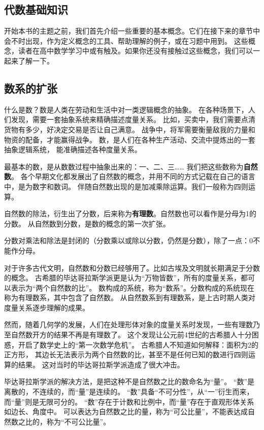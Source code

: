 \documentclass[12pt,UTF8]{ctexbook}
\begin{document}
\begin{appendix}

\chapter{代数基础知识}
开始本书的主题之前，我们首先介绍一些重要的基本概念。它们在接下来的章节中会不时出现，作为定义概念的工具、帮助理解的例子，或在习题中用到。
这些概念，读者在高中数学学习中或有触及。如果你还没有接触过这些概念，我们可以一起来了解一下。

\section{数系的扩张}
什么是数？数是人类在劳动和生活中对一类逻辑概念的抽象。
在各种场景下，人们发现，需要一套抽象系统来精确描述度量关系。
比如，买卖中，我们需要点清货物有多少，好决定交易是否让自己满意。
战争中，将军需要衡量敌我的力量和物资的配备，才能赢得战争。
数，是人们在各种生产活动、交流中提炼出的一套抽象逻辑系统，
能准确描述各种度量关系。

最基本的数，是从数数过程中抽象出来的：一、二、三…… 我们把这些数称为\textbf{自然数}。
各个早期文化都发展出了自然数的概念，并用不同的方式记载在自己的语言中，是为数字和数词。
伴随自然数出现的是加减乘除运算。我们一般称为四则运算。

自然数的除法，衍生出了分数，后来称为\textbf{有理数}。自然数也可以看作是分母为1的分数。
从自然数到分数，是数的概念的第一次扩张。

分数对乘法和除法是封闭的（分数乘以或除以分数，仍然是分数），除了一点：0不能作分母。

对于许多古代文明，自然数和分数已经够用了。比如古埃及文明就长期满足于分数的概念。
古希腊的毕达哥拉斯学派更是认为“万物皆数”，所有的度量关系，都可以表示为“两个自然数的比”。
数构成的系统，称为“数系”。分数构成的系统现在称为有理数系，其中包含了自然数。
从自然数系到有理数系，是上古时期人类对度量关系逐步理解的成果。

然而，随着几何学的发展，人们在处理形体对象的度量关系时发现，一些有理数乃至自然数开方的结果不再是有理数了。
这个发现让公元前4世纪的古希腊人十分困惑，开启了数学史上的“第一次数学危机”。
古希腊人不知道如何解释：面积为2的正方形，
其边长无法表示为两个自然数的比，甚至不是任何已知的数进行四则运算的结果。
这对当时的毕达哥拉斯学派造成了很大冲击。

毕达哥拉斯学派的解决方法，是把这种不是自然数之比的数命名为“量”。
“数”是离散的，不连续的，而“量”是连续的。
“数”具备“不可分性”，从“一”衍生而来，而“量”则是无限可分的。
“数”存在于计数和比例中，而“量”存在于直观形体关系如边长、角度中。
可以表达为自然数之比的量，称为“可公比量”，不能表达成自然数之比的，称为“不可公比量”。


\end{appendix}
\end{document}
